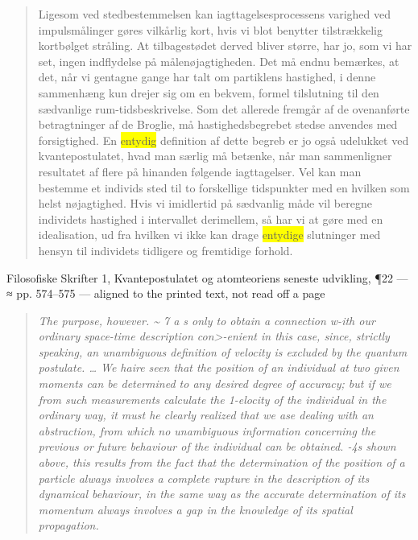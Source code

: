 \documentclass[11pt]{article}
\newcommand{\dcite}[1]{{\nopagebreak\raggedleft\small #1\par}\medskip}
\newcommand{\tlg}[1]{{\setlength{\fboxsep}{0.8pt}\colorbox{yellow}{#1}}}
\newcommand{\olg}[1]{{\setlength{\fboxsep}{0.8pt}\colorbox{cyan!25}{#1}}}
\begin{document}
\begin{quote}
Ligesom ved stedbestemmelsen kan iagttagelsesprocessens varighed ved impulsmålinger gøres vilkårlig kort, hvis vi blot benytter tilstrækkelig kortbølget stråling. At tilbagestødet derved bliver større, har jo, som vi har set, ingen indflydelse på målenøjagtigheden. Det må endnu bemærkes, at det, når vi gentagne gange har talt om partiklens hastighed, i denne sammenhæng kun drejer sig om en bekvem, formel tilslutning til den sædvanlige rum-tidsbeskrivelse. Som det allerede fremgår af de ovenanførte betragtninger af de Broglie, må hastighedsbegrebet stedse anvendes med forsigtighed. En \tlg{entydig} definition af dette begreb er jo også udelukket ved kvantepostulatet, hvad man særlig må betænke, når man sammenligner resultatet af flere på hinanden følgende iagttagelser. Vel kan man bestemme et individs sted til to forskellige tidspunkter med en hvilken som helst nøjagtighed. Hvis vi imidlertid på sædvanlig måde vil beregne individets hastighed i intervallet derimellem, så har vi at gøre med en idealisation, ud fra hvilken vi ikke kan drage \tlg{entydige} slutninger med hensyn til individets tidligere og fremtidige forhold.
\end{quote}
\dcite{Filosofiske Skrifter 1, Kvantepostulatet og atomteoriens seneste udvikling, ¶22 — ≈ pp. 574–575 — aligned to the printed text, not read off a page}
{\footnotesize\begin{quote}\itshape
The purpose, however. \textasciitilde{} 7 a s only to obtain a connection w-ith our ordinary space-time description con>-enient in this case, since, strictly speaking, an \olg{unambiguous} definition of velocity is excluded by the quantum postulate. … We haire seen that the position of an individual at two given moments can be determined to any desired degree of accuracy; but if we from such measurements calculate the 1-elocity of the individual in the ordinary way, it must he clearly realized that we ase dealing with an abstraction, from which no \olg{unambiguous} information concerning the previous or future behaviour of the individual can be obtained. -4s shown above, this results from the fact that the determination of the position of a particle always involves a complete rupture in the description of its dynamical behaviour, in the same way as the accurate determination of its momentum always involves a gap in the knowledge of its spatial propagation.
\end{quote}}
\end{document}
